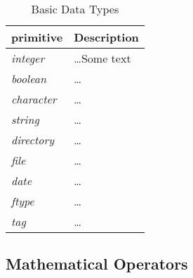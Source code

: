 \documentclass[11pt]{article}
\begin{document}
\begin{table}[ht]
  \centering
  \caption {Basic Data Types} \label{tab:title}
  \vspace{0.5em}
  \begin{tabular}{|m{8em}|b{25em}|}
  \hline

  \textbf{primitive}
  &
  \vspace{0.7em}
  \textbf{Description} \\ [0.7em]
  \hline

  \emph{integer}
  &
  \vspace{0.7em}
  \dots Some text
  \\[0.7em]
  \hline

  \emph{boolean}
  &
  \vspace{0.7em}
  \dots
  \\[0.7em]
  \hline

  \emph{character}
  &
  \vspace{0.7em}
  \dots
  \\[0.7em]
  \hline

  \emph{string}
  &
  \vspace{0.7em}
  \dots
  \\[0.7em]
  \hline

  \emph{directory}
  &
  \vspace{0.7em}
  \dots
  \\[0.7em]
  \hline

  \emph{file}
  &
  \vspace{0.7em}
  \dots
  \\[0.7em]
  \hline

  \emph{date}
  &
  \vspace{0.7em}
  \dots
  \\[0.7em]
  \hline

  \emph{ftype}
  &
  \vspace{0.7em}
  \dots
  \\[0.7em]
  \hline

  \emph{tag}
  &
  \vspace{0.7em}
  \dots
  \\[0.7em]
  \hline
  \end{tabular}
\end{table}

\subsection{Mathematical Operators}
\end{document}
